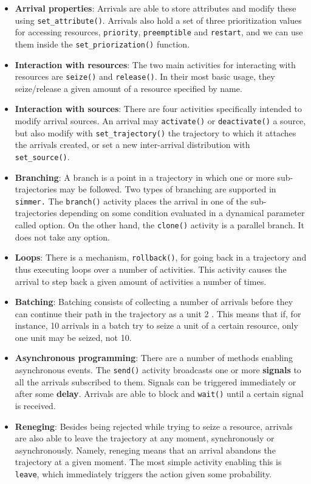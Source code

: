 \documentclass[
]{book}
\providecommand{\tightlist}{%
  \setlength{\itemsep}{0pt}\setlength{\parskip}{0pt}}
\begin{document}
\begin{itemize}
\tightlist
\item
  \textbf{Arrival properties}: Arrivals are able to store attributes and modify these using \texttt{set\_attribute()}. Arrivals also hold a set of three prioritization values for accessing resources, \texttt{priority}, \texttt{preemptible} and \texttt{restart}, and we can use them inside the \texttt{set\_priorization()} function.
\item
  \textbf{Interaction with resources}: The two main activities for interacting with resources are \texttt{seize()} and \texttt{release()}. In their most basic usage, they seize/release a given amount of a resource specified by name.
\item
  \textbf{Interaction with sources}: There are four activities specifically intended to modify arrival sources. An arrival may \texttt{activate()} or \texttt{deactivate()} a source, but also modify with \texttt{set\_trajectory()} the trajectory to which it attaches the arrivals created, or set a new inter-arrival distribution with \texttt{set\_source()}.
\item
  \textbf{Branching}: A branch is a point in a trajectory in which one or more sub-trajectories may be followed. Two types of branching are supported in \texttt{simmer.} The \texttt{branch()} activity places the arrival in one of the sub-trajectories depending on some condition evaluated in a dynamical parameter called option. On the other hand, the \texttt{clone()} activity is a parallel branch. It does not take any option.
\item
  \textbf{Loops}: There is a mechanism, \texttt{rollback()}, for going back in a trajectory and thus executing loops over a number of activities. This activity causes the arrival to step back a given amount of activities a number of times.
\item
  \textbf{Batching}: Batching consists of collecting a number of arrivals before they can continue their path in the trajectory as a unit 2 . This means that if, for instance, 10 arrivals in a batch try to seize a unit of a certain resource, only one unit may be seized, not 10.
\item
  \textbf{Asynchronous programming}: There are a number of methods enabling asynchronous events. The \texttt{send()} activity broadcasts one or more \textbf{signals} to all the arrivals subscribed to them. Signals can be triggered immediately or after some \textbf{delay}. Arrivals are able to block and \texttt{wait()} until a certain signal is received.
\item
  \textbf{Reneging}: Besides being rejected while trying to seize a resource, arrivals are also able to leave the trajectory at any moment, synchronously or asynchronously. Namely, reneging means that an arrival abandons the trajectory at a given moment. The most simple activity enabling this is \texttt{leave}, which immediately triggers the action given some probability.
\end{itemize}
\end{document}
